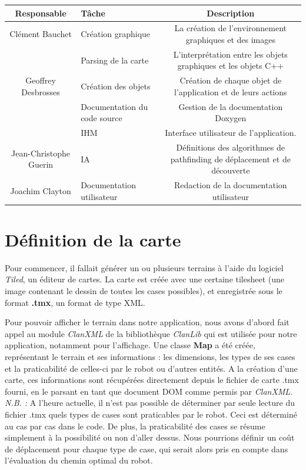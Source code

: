 \documentclass[a4paper 12pts]{article}
\begin{document}
\begin{tabular}{| c | p{6cm} | c |}
\hline
\textbf{Responsable} & \textbf{Tâche} & \textbf {Description} \\
\hline
Clément Bauchet & Création graphique & La création de l'environnement graphiques et des images \\					
& Parsing de la carte & L'interprétation entre les objets graphiques et les objets C++\\					
\hline				
Geoffrey Desbrosses & Création des objets & Création de chaque objet de l'application et de leurs actions\\
& Documentation du code source & Gestion de la documentation Doxygen \\ 
\hline
& IHM & Interface utilisateur de l'application. \\
\hline
Jean-Christophe Guerin & IA  & Définitions des algorithmes de pathfinding de déplacement et de découverte\\	
\hline
Joachim Clayton & Documentation utilisateur & Redaction de la documentation utilisateur \\                 
\end{tabular}

\section{Définition de la carte}

Pour commencer, il fallait générer un ou plusieurs terrains à l'aide du logiciel \emph{Tiled}, un éditeur de cartes. La carte est créée avec une certaine tilesheet (une image contenant le dessin de toutes les cases possibles), et enregistrée sous le format \textbf{.tmx}, un format de type XML.

Pour pouvoir afficher le terrain dans notre application, nous avons d'abord fait appel au module \emph{ClanXML} de la bibliothèque \emph{ClanLib} qui est utilisée pour notre application, notamment pour l'affichage. Une classe \textbf{Map} a été créée, représentant le terrain et ses informations : les dimensions, les types de ses cases et la praticabilité de celles-ci par le robot ou d'autres entités. A la création d'une carte, ces informations sont récupérées directement depuis le fichier de carte .tmx fourni, en le parsant en tant que document DOM comme permis par \emph{ClanXML}. \\
\emph{N.B. :} A l'heure actuelle, il n'est pas possible de déterminer par seule lecture du fichier .tmx quels types de cases sont praticables par le robot. Ceci est déterminé au cas par cas dans le code. De plus, la praticabilité des cases se résume simplement à la possibilité ou non d'aller dessus. Nous pourrions définir un coût de déplacement pour chaque type de case, qui serait alors pris en compte dans l'évaluation du chemin optimal du robot.
\end{document}
